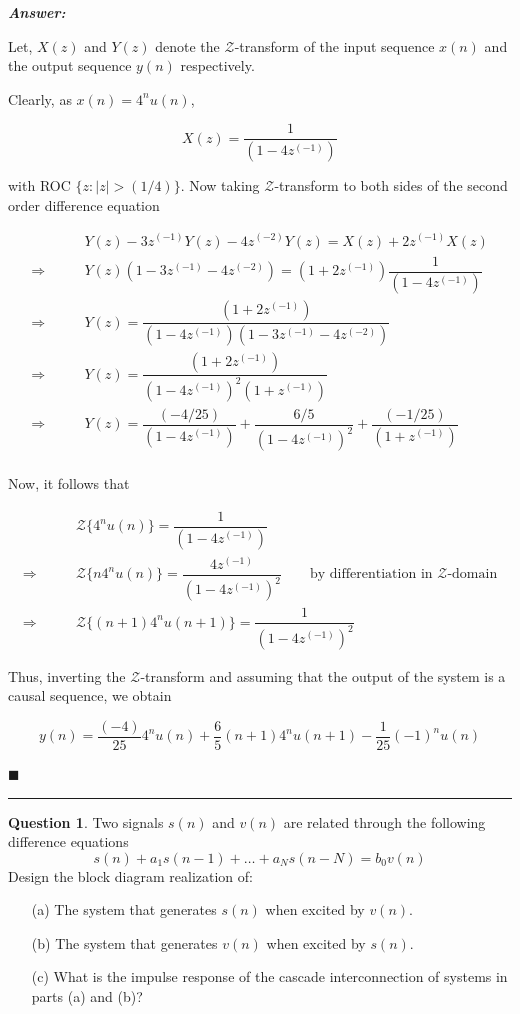 \documentclass[12pt]{article}
\theoremstyle{definition}
\newtheorem{question}{Question}
\newenvironment{answer}{
    \textbf{\textit{Answer:}} \qquad
}{\hfill $\blacksquare$ \\ 

\begin{center}
    \rule{0.8\linewidth}{1.5px} 
    \vspace*{1cm}   
\end{center}
}
\newcommand{\zcal}{\mathcal{Z}}
\newcommand{\inv}[1][1]{^{(- #1)}}
\begin{document}
\begin{answer}
    Let, $X(z)$ and $Y(z)$ denote the $\zcal$-transform of the input sequence $x(n)$ and the output sequence $y(n)$ respectively. 

    Clearly, as $x(n) = 4^n u(n)$,

    $$
    X(z) = \dfrac{1}{(1 - 4 z\inv)}
    $$

    with ROC $\{ z : \vert z \vert > (1/4) \}$. Now taking $\zcal$-transform to both sides of the second order difference equation 

    \begin{align*}
        & Y(z) - 3 z\inv Y(z) - 4 z\inv[2] Y(z) = X(z) + 2 z\inv X(z)\\
        \Rightarrow \qquad & Y(z) (1 - 3z\inv - 4z\inv[2]) = (1 + 2z\inv) \dfrac{1}{(1 - 4z\inv)}\\
        \Rightarrow \qquad & Y(z) = \dfrac{(1 + 2z\inv)}{(1 - 4z\inv)(1 - 3z\inv - 4z\inv[2])}\\
        \Rightarrow \qquad & Y(z) = \dfrac{(1 + 2z\inv)}{(1 - 4z\inv)^2(1 + z\inv)}\\
        \Rightarrow \qquad & Y(z) = \dfrac{(-4/25)}{(1 - 4z\inv)} + \dfrac{6/5}{(1 - 4z\inv)^2} + \dfrac{(-1/25)}{(1 + z\inv)}\\
    \end{align*}

    Now, it follows that

    \begin{align*}
        & \zcal\{ 4^n u(n) \} = \dfrac{1}{(1 - 4z\inv)}\\
        \Rightarrow \qquad & \zcal\{ n4^n u(n) \} = \dfrac{4z\inv}{(1 - 4z\inv)^2} \qquad \text{by differentiation in } \zcal \text{-domain}\\
        \Rightarrow \qquad & \zcal\{ (n+1)4^{n}u(n+1) \} = \dfrac{1}{(1 - 4z\inv)^2}
    \end{align*}

    Thus, inverting the $\zcal$-transform and assuming that the output of the system is a causal sequence, we obtain

    $$
    y(n) = \dfrac{(-4)}{25} 4^n u(n) + \dfrac{6}{5} (n+1) 4^n u(n+1) - \dfrac{1}{25} (-1)^n u(n)
    $$

\end{answer}




\begin{question}
    Two signals $s(n)$ and $v(n)$ are related through the following difference equations
    $$
    s(n) + a_1 s(n-1) + \dots + a_N s(n-N) = b_0 v(n)
    $$
    Design the block diagram realization of:
    \begin{enumerate}
        \item[(a)] The system that generates $s(n)$ when excited by $v(n)$.
        \item[(b)] The system that generates $v(n)$ when excited by $s(n)$.
        \item[(c)] What is the impulse response of the cascade interconnection of systems in parts (a) and (b)?
    \end{enumerate}
\end{question}
\end{document}
